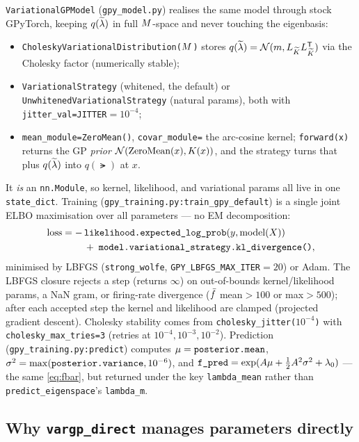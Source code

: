 \texttt{VariationalGPModel} (\texttt{gpy\_model.py}) realises the same model
through stock GPyTorch, keeping $q(\widetilde{\lambda})$ in full $M$-space and never
touching the eigenbasis:
\begin{itemize}[nosep]
  \item \texttt{CholeskyVariationalDistribution($M$)} stores
    $q(\widetilde{\lambda})=\mathcal{N}(m,L_{\widetilde{K}}L_{\widetilde{K}}^{\mathsf{T}})$ via the Cholesky factor
    (numerically stable);
  \item \texttt{VariationalStrategy} (whitened, the default) or
    \texttt{UnwhitenedVariationalStrategy} (natural params), both with
    \texttt{jitter\_val=JITTER}$=10^{-4}$;
  \item \texttt{mean\_module=ZeroMean()}, \texttt{covar\_module=} the arc-cosine
    kernel; \texttt{forward(x)} returns the GP \emph{prior}
    $\mathcal{N}(\text{ZeroMean}(x),K(x))$, and the strategy turns that plus
    $q(\widetilde{\lambda})$ into $q(\lat)$ at $x$.
\end{itemize}
It \emph{is} an \texttt{nn.Module}, so kernel, likelihood, and variational params
all live in one \texttt{state\_dict}. Training (\texttt{gpy\_training.py:\allowbreak train\_gpy\_default})
is a single joint ELBO maximisation over all parameters --- no EM decomposition:
\begin{equation}
\begin{aligned}
  \text{loss}=-\,&\texttt{likelihood.expected\_log\_prob}(y,\text{model}(X)) \\
    &+\;\texttt{model.variational\_strategy.kl\_divergence()},
\end{aligned}
\end{equation}
minimised by LBFGS (\texttt{strong\_wolfe}, \texttt{GPY\_LBFGS\_MAX\_ITER}$=20$) or
Adam. The LBFGS closure rejects a step (returns $\infty$) on out-of-bounds
kernel/likelihood params, a NaN gram, or firing-rate divergence
($\bar{f}$ mean$>100$ or max$>500$); after each accepted step the kernel and
likelihood are clamped (projected gradient descent). Cholesky stability comes from
\texttt{cholesky\_jitter($10^{-4}$)} with \texttt{cholesky\_max\_tries=3} (retries
at $10^{-4},10^{-3},10^{-2}$). Prediction (\texttt{gpy\_training.py:\allowbreak predict})
computes $\mu=\texttt{posterior.mean}$, $\sigma^{2}=\max(\texttt{posterior.variance},10^{-6})$,
and $\texttt{f\_pred}=\exp(A\mu+\tfrac12A^2\sigma^{2}+\lambda_{0})$ --- the same
\eqref{eq:fbar}, but returned under the key \texttt{lambda\_mean} rather than
\texttt{predict\_eigenspace}'s \texttt{lambda\_m}.

\subsection{Why \texttt{vargp\_direct} manages parameters directly}\label{sec:whymanage}

